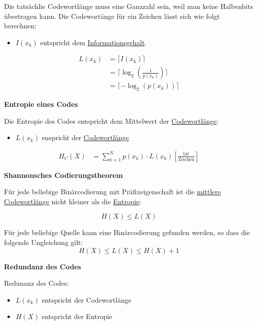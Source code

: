 \documentclass[11pt,twoside,twocolumn,landscape]{article}
\begin{document}
Die tatsächlie Codewortlänge muss eine Ganzzahl sein, weil man keine Halbenbits übertragen kann.
Die Codewortänge für ein Zeichen lässt sich wie folgt berechnen:
\begin{itemize}
\item \(I(x_k)\) entspricht dem \href{../../../roam/20211001175826-was_ist_der_informationsgehalt_eines_zeichen.org}{Informationsgehalt}.
\end{itemize}

\begin{align}
L(x_k) &= \lceil I(x_k) \rceil \\
&= \lceil \log_2(\frac{1}{p(x_k)}) \rceil \\
&= \lceil -\log_2(p(x_k)) \rceil
\end{align}

\textbf{Entropie eines Codes}

Die Entropie des Codes entspricht dem Mittelwert der \href{../../../roam/20211001182658-warum_muss_die_codewortlange_eine_ganzzahl_sein.org}{Codewortlänge}:
\begin{itemize}
\item \(L(x_k)\) enspricht der \href{../../../roam/20211001182658-warum_muss_die_codewortlange_eine_ganzzahl_sein.org}{Codewortlänge}
\end{itemize}

\begin{align}
H_C(X) &= \sum_{k=1}^N p(x_k) \cdot L(x_k) [\frac{\text{bit}}{\text{Zeichen}}]
\end{align}

\textbf{Shannonsches Codierungstheorem}

Für jede beliebige Binärcodierung mit Präfixeigenschaft ist die \href{../../../roam/20211001191148-was_ist_die_entropie_eines_codes.org}{mittlere Codewortlänge} nicht kleiner als die \href{../../../roam/20211001180418-was_ist_die_entropie_in_der_informationstheorie.org}{Entropie}:

\begin{equation}
H(X) \leq L(X)
\end{equation}

Für jede beliebige Quelle kann eine Binärcodierung gefunden werden, so dass die folgende Ungleichung gilt:
\begin{equation}
H(X) \leq L(X) \leq H(X) + 1
\end{equation}

\textbf{Redundanz des Codes}

Redunanz des Codes:
\begin{itemize}
\item \(L(x_k)\) entspricht der Codewortlänge
\item \(H(X)\) entspricht der Entropie
\end{itemize}
\end{document}
